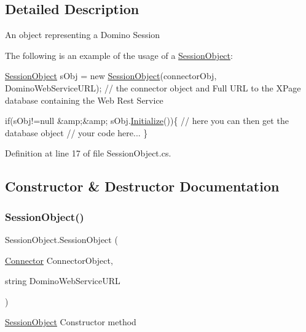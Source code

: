 \subsection{Detailed Description}
An object representing a Domino Session 

The following is an example of the usage of a {\ttfamily \mbox{\hyperlink{class_session_object}{Session\+Object}}}\+: 
\begin{DoxyCode}
\mbox{\hyperlink{class_session_object}{SessionObject}} sObj = \textcolor{keyword}{new} \mbox{\hyperlink{class_session_object_a173822a7aec467880195d79a1bc9f520}{SessionObject}}(connectorObj, DominoWebServiceURL); \textcolor{comment}{// the
       connector object and Full URL to the XPage database containing the Web Rest Service}

\textcolor{keywordflow}{if}(sObj!=null &amp;&amp; sObj.\mbox{\hyperlink{class_session_object_af3b9c9d56d98c848061952ed935f815b}{Initialize}}())\{
     \textcolor{comment}{// here you can then get the database object}
     \textcolor{comment}{// your code here...}
\}
\end{DoxyCode}
 

Definition at line 17 of file Session\+Object.\+cs.



\subsection{Constructor \& Destructor Documentation}
\mbox{\label{class_session_object_a173822a7aec467880195d79a1bc9f520}} 
\subsubsection{\texorpdfstring{Session\+Object()}{SessionObject()}}
{\footnotesize\ttfamily Session\+Object.\+Session\+Object (\begin{DoxyParamCaption}\item[{\mbox{\hyperlink{class_connector}{Connector}}}]{Connector\+Object,  }\item[{string}]{Domino\+Web\+Service\+U\+RL }\end{DoxyParamCaption})}



\mbox{\hyperlink{class_session_object}{Session\+Object}} Constructor method 


